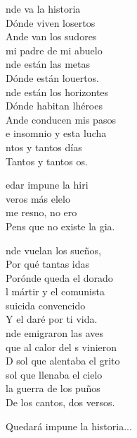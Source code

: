 \begin{cancion}%
	nde va la historia \\
	Dónde viven losertos \\
	Ande van los sudores \\
	mi padre de mi abuelo \\
	nde están las metas \\
	Dónde están louertos. \\
	\jump
	nde están los horizontes \\
	Dónde habitan lhéroes \\
	Ande conducen mis pasos \\
	e insomnio y esta lucha \\
	ntos y tantos días \\
	Tantos y tantos os. \jump\\
	\begin{chorus}%
		edar impune la hiri \\
		 veros más elelo \\
		 me resno, no ero  \\
		Pens que no existe la gia. \jump\\
	\end{chorus}%
	nde vuelan los sueños, \\
	Por qué tantas idas \\
	Porónde queda el dorado \\
	l mártir y el comunista \\
	 suicida convencido \\
	Y el daré por ti vida.\\
	\jump
	nde emigraron las aves \\
	que al calor del s vinieron \\
	D sol que alentaba el grito \\
	 sol que llenaba el cielo \\
	 la guerra de los puños \\
	De los cantos, dos versos.\jump\\
	\begin{chorus}%
	Quedará impune la historia...\jump\\
	\end{chorus}%
\end{cancion}%
